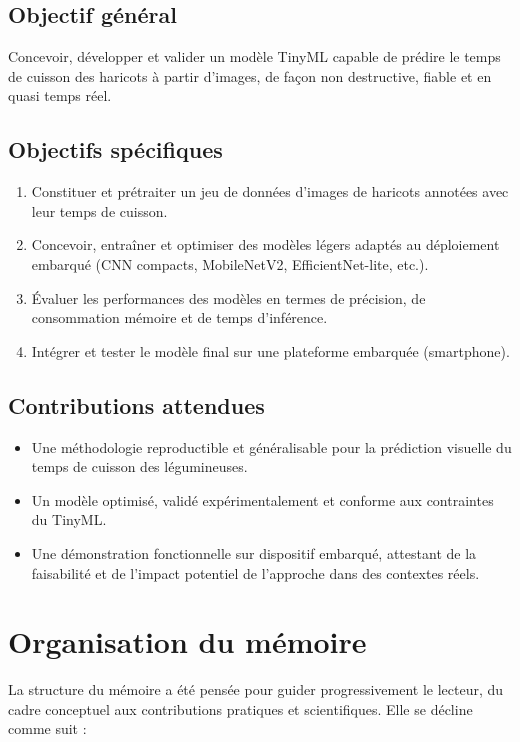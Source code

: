 \subsection{Objectif général}
Concevoir, développer et valider un modèle TinyML capable de prédire le temps de cuisson des haricots à partir d’images, de façon non destructive, fiable et en quasi temps réel.

\subsection{Objectifs spécifiques}
\begin{enumerate}
	\item Constituer et prétraiter un jeu de données d’images de haricots annotées avec leur temps de cuisson.
	\item Concevoir, entraîner et optimiser des modèles légers adaptés au déploiement embarqué (CNN compacts, MobileNetV2, EfficientNet-lite, etc.).
	\item Évaluer les performances des modèles en termes de précision, de consommation mémoire et de temps d’inférence.
	\item Intégrer et tester le modèle final sur une plateforme embarquée (smartphone).
\end{enumerate}

\subsection{Contributions attendues}
\begin{itemize}
	\item Une méthodologie reproductible et généralisable pour la prédiction visuelle du temps de cuisson des légumineuses.
	\item Un modèle optimisé, validé expérimentalement et conforme aux contraintes du TinyML.
	\item Une démonstration fonctionnelle sur dispositif embarqué, attestant de la faisabilité et de l’impact potentiel de l’approche dans des contextes réels.
\end{itemize}

\section{Organisation du mémoire}
La structure du mémoire a été pensée pour guider progressivement le lecteur, du cadre conceptuel aux contributions pratiques et scientifiques. Elle se décline comme suit :

